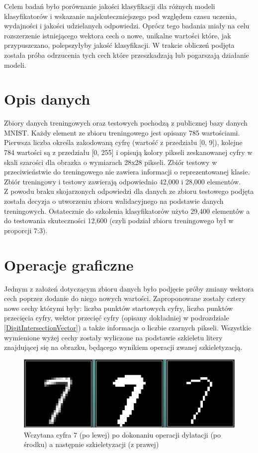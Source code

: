 \documentclass{article}
\begin{document}
Celem badań było porównanie jakości klasyfikacji dla różnych modeli klasyfikatorów i wskazanie najskuteczniejszego pod względem czasu uczenia, wydajności i jakości udzielanych odpowiedzi. Oprócz tego badania miały na celu rozszerzenie istniejącego wektora cech o nowe, unikalne wartości które, jak przypuszczano, polepszyłyby jakość klasyfikacji. W trakcie obliczeń podjęta została próba odrzucenia tych cech które przeszkadzają lub pogarszają działanie modeli. \\


\section{Opis danych}

Zbiory danych treningowych oraz testowych pochodzą z publicznej bazy danych MNIST\cite{mnist_database}. Każdy element ze zbioru treningowego jest opisany 785 wartościami. Pierwsza liczba określa zakodowaną cyfrę (wartość z przedziału [0, 9]), kolejne 784 wartości są z przedziału [0, 255] i opisują kolory pikseli zeskanowanej cyfry w skali szarości dla obrazka o wymiarach 28x28 pikseli. Zbiór testowy w przeciwieństwie do treningowego nie zawiera informacji o reprezentowanej klasie. Zbiór treningowy i testowy zawierają odpowiednio 42,000 i 28,000 elementów. \\

Z powodu braku skojarzonych odpowiedzi dla danych ze zbioru testowego podjęta została decyzja o utworzeniu zbioru walidacyjnego na podstawie danych treningowych. Ostatecznie do szkolenia klasyfikatorów użyto 29,400 elementów a do testowania skuteczności 12,600 (czyli podział zbioru treningowego był w proporcji 7:3).

\section{Operacje graficzne}
\label{features_vector}
Jednym z założeń dotyczącym zbioru danych było podjęcie próby zmiany wektora cech poprzez dodanie do niego nowych wartości. Zaproponowane zostały cztery nowe cechy którymi były: liczba punktów startowych cyfry, liczba punktów przecięcia cyfry, wektor przecięć cyfry (opisany dokładniej w podrozdziale \ref{DigitIntersectionVector}) a także informacja o liczbie czarnych pikseli. Wszystkie wymienione wyżej cechy zostały wyliczone na podstawie szkieletu litery znajdującej się na obrazku, będącego wynikiem operacji zwanej szkieletyzacją. 

\begin{figure}[htp]
	\centering
	\includegraphics[width=1\textwidth]{Figures/graphic_operations.png}
	\caption{ Wczytana cyfra 7 (po lewej) po dokonaniu operacji dylatacji (po środku) a następnie szkieletyzacji (z prawej) }
\end{figure}
\end{document}
